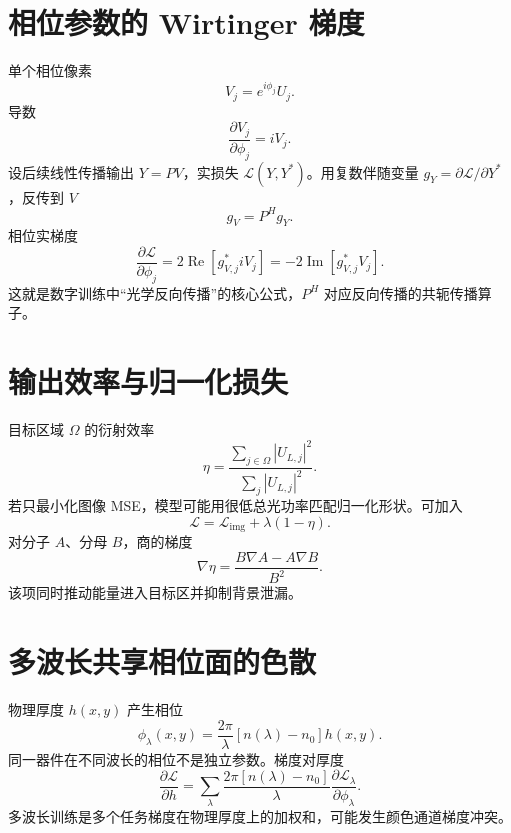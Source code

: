 \documentclass[UTF8,12pt,a4paper,fontset=none]{ctexart}
\numberwithin{equation}{section}
\newcommand{\Loss}{\mathcal{L}}
\begin{document}
\section{相位参数的 Wirtinger 梯度}
单个相位像素
\begin{equation}
 V_j=e^{i\phi_j}U_j.
\end{equation}
导数
\begin{equation}
 \frac{\partial V_j}{\partial\phi_j}=iV_j.
\end{equation}
设后续线性传播输出 $Y=PV$，实损失 $\Loss(Y,Y^*)$。用复数伴随变量 $g_Y=\partial\Loss/\partial Y^*$，反传到 $V$
\begin{equation}
 g_V=P^Hg_Y.
\end{equation}
相位实梯度
\begin{equation}
 \boxed{
 \frac{\partial\Loss}{\partial\phi_j}
 =2\operatorname{Re}[g_{V,j}^*iV_j]
 =-2\operatorname{Im}[g_{V,j}^*V_j].
 }
\end{equation}
这就是数字训练中“光学反向传播”的核心公式，$P^H$ 对应反向传播的共轭传播算子。

\section{输出效率与归一化损失}
目标区域 $\Omega$ 的衍射效率
\begin{equation}
 \eta=\frac{\sum_{j\in\Omega}|U_{L,j}|^2}
 {\sum_j|U_{L,j}|^2}.
\end{equation}
若只最小化图像 MSE，模型可能用很低总光功率匹配归一化形状。可加入
\begin{equation}
 \Loss=\Loss_{\mathrm{img}}+\lambda(1-\eta).
\end{equation}
对分子 $A$、分母 $B$，商的梯度
\begin{equation}
 \nabla\eta=\frac{B\nabla A-A\nabla B}{B^2}.
\end{equation}
该项同时推动能量进入目标区并抑制背景泄漏。

\section{多波长共享相位面的色散}
物理厚度 $h(x,y)$ 产生相位
\begin{equation}
 \phi_\lambda(x,y)=\frac{2\pi}{\lambda}[n(\lambda)-n_0]h(x,y).
\end{equation}
同一器件在不同波长的相位不是独立参数。梯度对厚度
\begin{equation}
 \frac{\partial\Loss}{\partial h}
 =\sum_\lambda
 \frac{2\pi[n(\lambda)-n_0]}{\lambda}
 \frac{\partial\Loss_\lambda}{\partial\phi_\lambda}.
\end{equation}
多波长训练是多个任务梯度在物理厚度上的加权和，可能发生颜色通道梯度冲突。
\end{document}
